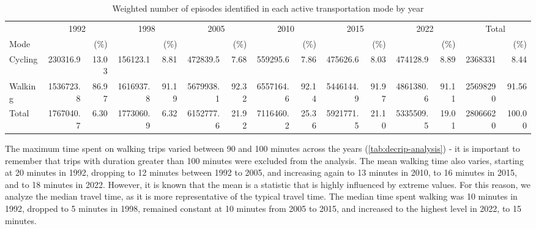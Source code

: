 \documentclass[preprint, 3p,
authoryear]{elsarticle} %
\begin{document}
\begingroup\fontsize{6}{8}\selectfont

\begin{longtable}[t]{lrrrrrrrrrrrrrr}
\caption{\label{tab:bulding table-01}\label{tab:episodes-count-percentages}Weighted number of episodes identified in each active transportation mode by year}\\
\toprule
\multicolumn{1}{c}{ } & \multicolumn{2}{c}{1992} & \multicolumn{2}{c}{1998} & \multicolumn{2}{c}{2005} & \multicolumn{2}{c}{2010} & \multicolumn{2}{c}{2015} & \multicolumn{2}{c}{2022} & \multicolumn{2}{c}{Total} \\
\cmidrule(l{3pt}r{3pt}){2-3} \cmidrule(l{3pt}r{3pt}){4-5} \cmidrule(l{3pt}r{3pt}){6-7} \cmidrule(l{3pt}r{3pt}){8-9} \cmidrule(l{3pt}r{3pt}){10-11} \cmidrule(l{3pt}r{3pt}){12-13} \cmidrule(l{3pt}r{3pt}){14-15}
Mode &  & (\%) &  & (\%) &  & (\%) &  & (\%) &  & (\%) &  & (\%) &  & (\%)\\
\midrule
Cycling & 230316.9 & 13.03 & 156123.1 & 8.81 & 472839.5 & 7.68 & 559295.6 & 7.86 & 475626.6 & 8.03 & 474128.9 & 8.89 & 2368331 & 8.44\\
Walking & 1536723.8 & 86.97 & 1616937.8 & 91.19 & 5679938.1 & 92.32 & 6557164.6 & 92.14 & 5446144.9 & 91.97 & 4861380.6 & 91.11 & 25698290 & 91.56\\
Total & 1767040.7 & 6.30 & 1773060.9 & 6.32 & 6152777.6 & 21.92 & 7116460.2 & 25.36 & 5921771.5 & 21.10 & 5335509.5 & 19.01 & 28066620 & 100.00\\
\bottomrule
\end{longtable}
\endgroup{}

The maximum time spent on walking trips varied between 90 and 100
minutes across the years (\ref{tab:decrip-analysis}) - it is important
to remember that trips with duration greater than 100 minutes were
excluded from the analysis. The mean walking time also varies, starting
at 20 minutes in 1992, dropping to 12 minutes between 1992 to 2005, and
increasing again to 13 minutes in 2010, to 16 minutes in 2015, and to 18
minutes in 2022. However, it is known that the mean is a statistic that
is highly influenced by extreme values. For this reason, we analyze the
median travel time, as it is more representative of the typical travel
time. The median time spent walking was 10 minutes in 1992, dropped to 5
minutes in 1998, remained constant at 10 minutes from 2005 to 2015, and
increased to the highest level in 2022, to 15 minutes.

\begingroup\fontsize{8}{10}\selectfont
\end{document}
